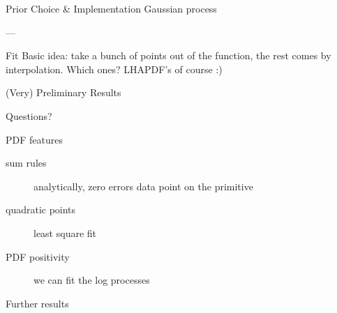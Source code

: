 \documentclass[9pt]{beamer}
\begin{document}
\begin{frame}{Prior Choice \& Implementation}
    Gaussian process
    
    ---

    Fit Basic idea: take a bunch of points out of the function, the rest comes
    by interpolation. Which ones? LHAPDF's of course :)
\end{frame}


\begin{frame}{(Very) Preliminary Results}
\end{frame}

\begin{frame}[standout]
    Questions?
\end{frame}

\appendix

\begin{frame}{PDF features}
    \begin{description}
        \item[sum rules] analytically, zero errors data point on the primitive
        \item[quadratic points] least square fit
        \item[PDF positivity] we can fit the log processes
    \end{description}
\end{frame}

\begin{frame}{Further results}
\end{frame}
\end{document}
